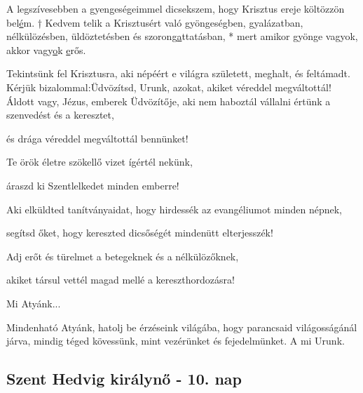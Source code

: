 \documentclass[twoside]{article}
\begin{document}
A legszívesebben a gyengeségeimmel dicsekszem, hogy Krisztus ereje költözzön bel\underline{é}m. † Kedvem telik a Krisztusért való gyöngeségben, gyalázatban, nélkülözésben, üldöztetésben és szorong\underline{a}ttatásban, * mert amikor gyönge vagyok, akkor vagy\underline{o}k \underline{e}rős.







\begin{preces}{Tekintsünk fel Krisztusra, aki népéért e világra született, meghalt, és feltámadt. Kérjük bizalommal:}{Üdvözítsd, Urunk, azokat, akiket véreddel megváltottál!}
  Áldott vagy, Jézus, emberek Üdvözítője, aki nem haboztál vállalni értünk a szenvedést és a keresztet,

  \reddash és drága véreddel megváltottál bennünket!

  Te örök életre szökellő vizet ígértél nekünk,

  \reddash áraszd ki Szentlelkedet minden emberre!

  Aki elküldted tanítványaidat, hogy hirdessék az evangéliumot minden népnek,

  \reddash segítsd őket, hogy kereszted dicsőségét mindenütt elterjesszék!

  Adj erőt és türelmet a betegeknek és a nélkülözőknek,

  \reddash akiket társul vettél magad mellé a kereszthordozásra!
\end{preces}
Mi Atyánk...

Mindenható Atyánk, hatolj be érzéseink világába, hogy parancsaid világosságánál járva, mindig téged kövessünk, mint vezérünket és fejedelmünket. A mi Urunk.


\subsection*{Szent Hedvig királynő - 10. nap}

\begin{center}\end{center}
\end{document}
